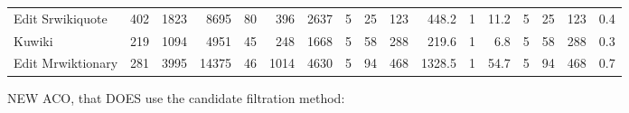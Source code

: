\documentclass{article}
\begin{document}
\begin{landscape}
\begin{table}[htbp]
\begin{tabular}{l *{16}{r}}
        Edit Srwikiquote & 402 & 1823 & 8695 & 80 & 396 & 2637 & 5 & 25 & 123 & 448.2 & 1 & 11.2 & 5 & 25 & 123 & 0.4 \\
        Kuwiki & 219 & 1094 & 4951 & 45 & 248 & 1668 & 5 & 58 & 288 & 219.6 & 1 & 6.8 & 5 & 58 & 288 & 0.3 \\
        Edit Mrwiktionary & 281 & 3995 & 14375 & 46 & 1014 & 4630 & 5 & 94 & 468 & 1328.5 & 1 & 54.7 & 5 & 94 & 468 & 0.7 \\
        \bottomrule
      \end{tabular}
    \end{table}
    \end{landscape}
    
NEW ACO, that DOES use the candidate filtration method:
\begin{landscape}
    \begin{table}[htbp]
      \centering
      \caption{$k=2, \theta=5$}
    

\end{table}
\end{landscape}
\end{document}
